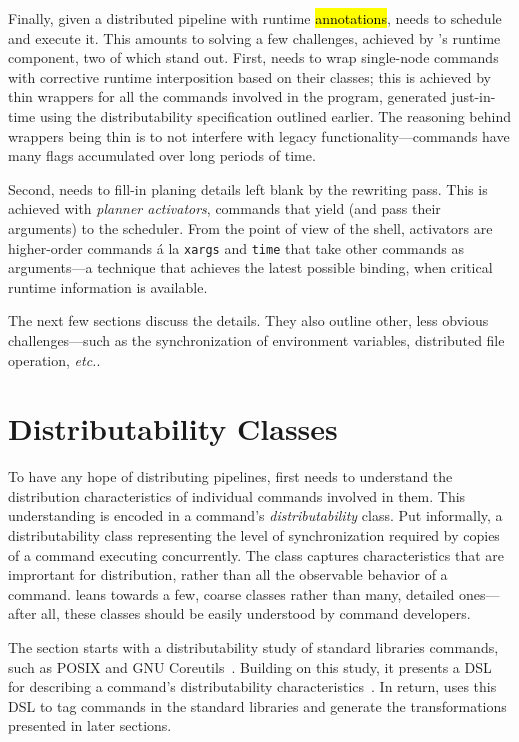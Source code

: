 \documentclass[sigplan,10pt,review,anonymous]{acmart}
\newcommand{\etc}{{\em etc.}\xspace}
\newcommand{\ttt}[1]{\texttt{\small #1}}
\newcommand{\todo}[1]{\hl{#1}\xspace}
\begin{document}
Finally, given a distributed pipeline with runtime \todo{annotations}, \sys needs to schedule and execute it.
This amounts to solving a few challenges, achieved by \sys's runtime component, two of which stand out.
First, \sys needs to wrap single-node commands with corrective runtime interposition based on their classes;
  this is achieved by thin wrappers for all the commands involved in the program, generated just-in-time using the distributability specification outlined earlier.
The reasoning behind wrappers being thin is to not interfere with legacy functionality---commands have many flags accumulated over long periods of time.

Second, \sys needs to fill-in planing details left blank by the rewriting pass.
This is achieved with \emph{planner activators}, commands that yield (and pass their arguments) to the scheduler.
From the point of view of the shell, activators are higher-order commands \'{a} la \ttt{xargs} and \ttt{time} that take other commands as arguments---a technique that achieves the latest possible binding, when critical runtime information is available.

The next few sections discuss the details.
They also outline other, less obvious challenges---such as the synchronization of environment variables, distributed file operation, \etc.


\section{Distributability Classes}
\label{distributability}

To have any hope of distributing \unix pipelines, \sys first needs to understand the distribution characteristics of individual commands involved in them.
This understanding is encoded in a command's \emph{distributability} class.
Put informally, a distributability class representing the level of synchronization required by copies of a command executing concurrently.
The class captures characteristics that are imprortant for distribution, rather than all the observable behavior of a command.
\sys leans towards a few, coarse classes rather than many, detailed ones---after all, these classes should be easily understood by command developers.

The section starts with a distributability study of standard libraries commands, such as {\sc POSIX} and GNU Coreutils~.
Building on this study, it presents a DSL for describing a command's distributability characteristics~.
In return, \sys uses this DSL to tag commands in the standard libraries and generate the transformations presented in later sections.
\end{document}
